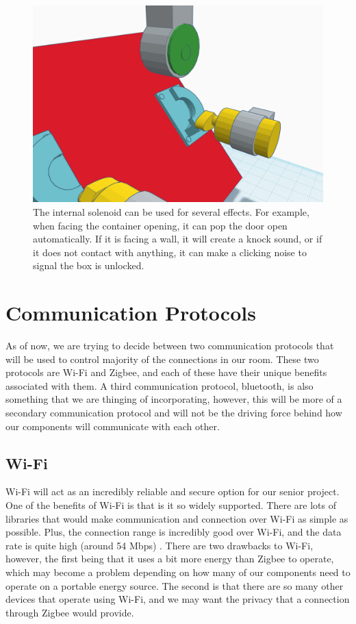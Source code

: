 \documentclass[conference]{IEEEtran}
\begin{document}
\begin{figure}[H]
    \centering
    \includegraphics[width=0.85\columnwidth]{Images/OpenContainer.png}
    \caption{The internal solenoid can be used for several effects. For example, when facing the container opening, it can pop the 
    door open automatically. If it is facing a wall, it will create a knock sound, or if it does not contact with anything, it can
    make a clicking noise to signal the box is unlocked.}
\end{figure}

\section{Communication Protocols}
As of now, we are trying to decide between two communication protocols that will be used
to control majority of the connections in our room. These two protocols are Wi-Fi and Zigbee,
and each of these have their unique benefits associated with them. A third communication
protocol, bluetooth, is also something that we are thinging of incorporating, however, this
will be more of a secondary communication protocol and will not be the driving force behind
how our components will communicate with each other.

\subsection*{Wi-Fi}
Wi-Fi will act as an incredibly reliable and secure option for our senior project. One of the benefits of Wi-Fi
is that is it so widely supported. There are lots of libraries that would make communication and connection over
Wi-Fi as simple as possible. Plus, the connection range is incredibly good over Wi-Fi, and the data rate is quite high
(around 54 Mbps) \cite{wifiVsZigbee}. There are two drawbacks to Wi-Fi, however, the first being that it uses a bit more energy than Zigbee
to operate, which may become a problem depending on how many of our components need to operate on a portable energy
source. The second is that there are so many other devices that operate using Wi-Fi, and we may want the privacy that
a connection through Zigbee would provide.
\end{document}
